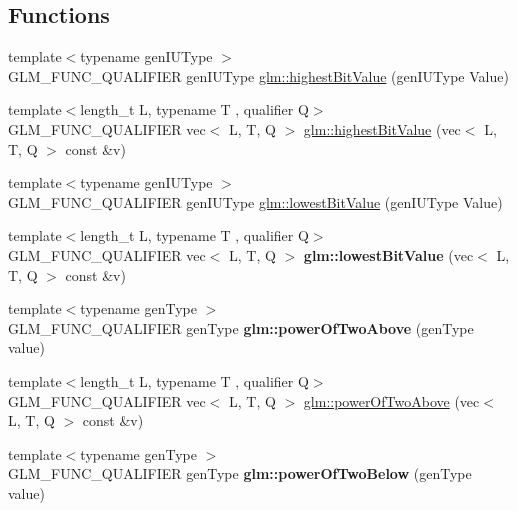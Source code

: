 \subsection*{Functions}
\begin{DoxyCompactItemize}
\item 
{\footnotesize template$<$typename gen\+I\+U\+Type $>$ }\\G\+L\+M\+\_\+\+F\+U\+N\+C\+\_\+\+Q\+U\+A\+L\+I\+F\+I\+ER gen\+I\+U\+Type \hyperlink{group__gtx__bit_ga0dcc8fe7c3d3ad60dea409281efa3d05}{glm\+::highest\+Bit\+Value} (gen\+I\+U\+Type Value)
\item 
{\footnotesize template$<$length\+\_\+t L, typename T , qualifier Q$>$ }\\G\+L\+M\+\_\+\+F\+U\+N\+C\+\_\+\+Q\+U\+A\+L\+I\+F\+I\+ER vec$<$ L, T, Q $>$ \hyperlink{group__gtx__bit_ga898ef075ccf809a1e480faab48fe96bf}{glm\+::highest\+Bit\+Value} (vec$<$ L, T, Q $>$ const \&v)
\item 
{\footnotesize template$<$typename gen\+I\+U\+Type $>$ }\\G\+L\+M\+\_\+\+F\+U\+N\+C\+\_\+\+Q\+U\+A\+L\+I\+F\+I\+ER gen\+I\+U\+Type \hyperlink{group__gtx__bit_ga2ff6568089f3a9b67f5c30918855fc6f}{glm\+::lowest\+Bit\+Value} (gen\+I\+U\+Type Value)
\item 
\mbox{\label{bit_8inl_a1f1ffbc1179f77df9c5db1eea899754c}} 
{\footnotesize template$<$length\+\_\+t L, typename T , qualifier Q$>$ }\\G\+L\+M\+\_\+\+F\+U\+N\+C\+\_\+\+Q\+U\+A\+L\+I\+F\+I\+ER vec$<$ L, T, Q $>$ {\bfseries glm\+::lowest\+Bit\+Value} (vec$<$ L, T, Q $>$ const \&v)
\item 
\mbox{\label{bit_8inl_a4f29a0e902ea0e3a76fc10c5b0ef31b6}} 
{\footnotesize template$<$typename gen\+Type $>$ }\\G\+L\+M\+\_\+\+F\+U\+N\+C\+\_\+\+Q\+U\+A\+L\+I\+F\+I\+ER gen\+Type {\bfseries glm\+::power\+Of\+Two\+Above} (gen\+Type value)
\item 
{\footnotesize template$<$length\+\_\+t L, typename T , qualifier Q$>$ }\\G\+L\+M\+\_\+\+F\+U\+N\+C\+\_\+\+Q\+U\+A\+L\+I\+F\+I\+ER vec$<$ L, T, Q $>$ \hyperlink{group__gtx__bit_ga2bbded187c5febfefc1e524ba31b3fab}{glm\+::power\+Of\+Two\+Above} (vec$<$ L, T, Q $>$ const \&v)
\item 
\mbox{\label{bit_8inl_a895c5bb540f5f52ef2b7a81321a98627}} 
{\footnotesize template$<$typename gen\+Type $>$ }\\G\+L\+M\+\_\+\+F\+U\+N\+C\+\_\+\+Q\+U\+A\+L\+I\+F\+I\+ER gen\+Type {\bfseries glm\+::power\+Of\+Two\+Below} (gen\+Type value)

\end{DoxyCompactItemize}
